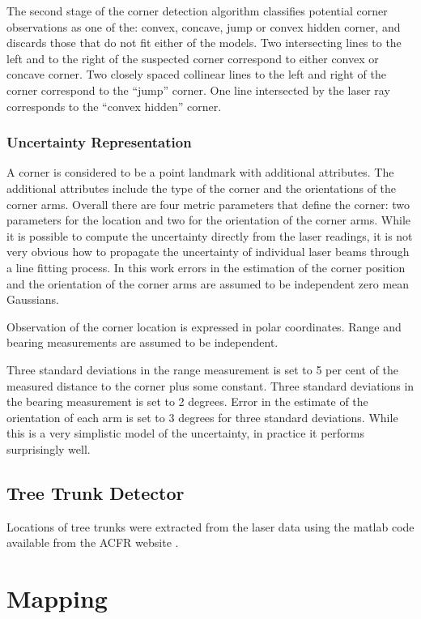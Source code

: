 The second stage of the corner detection algorithm classifies potential
corner observations as one of the: convex, concave, jump or convex
hidden corner, and discards those that do not fit either of the
models. Two intersecting lines to the left and to the right of the
suspected corner correspond to either convex or concave corner. Two
closely spaced collinear lines to the left and right of the corner
correspond to the ``jump'' corner. One line intersected by the laser
ray corresponds to the ``convex hidden'' corner.


\subsubsection{Uncertainty Representation}

A corner is considered to be a point landmark with additional
attributes. The additional attributes include the type of the corner
and the orientations of the corner arms. Overall there are four metric
parameters that define the corner: two parameters for the location and
two for the orientation of the corner arms. While it is possible to
compute the uncertainty directly from the laser readings, it is not
very obvious how to propagate the uncertainty of individual laser beams
through a line fitting process. In this work errors in the estimation
of the corner position and the orientation of the corner arms are
assumed to be independent zero mean Gaussians.

Observation of the corner location is expressed in polar coordinates.
Range and bearing measurements are assumed to be independent. 

Three standard deviations in the range measurement is set to 5 per
cent of the measured distance to the corner plus some constant. Three
standard deviations in the bearing measurement is set to 2 degrees.
Error in the estimate of the orientation of each arm is set to 3
degrees for three standard deviations. While this is a very simplistic
model of the uncertainty, in practice it performs surprisingly well.


\subsection{Tree Trunk Detector}

Locations of tree trunks were extracted from the laser data using the
matlab code available from the ACFR website \cite{VP_dataset}.


\section{Mapping}


